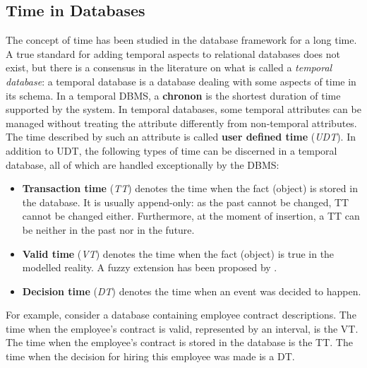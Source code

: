 %
%
\subsection{\label{subsec:time-in-databases}Time in Databases}
The concept of time has been studied in the database framework for a long time. A true standard for adding temporal aspects to relational databases does not exist, but there is a consensus in the literature \cite{Dyreson1994} on what is called a \emph{temporal database}: a temporal database is a database dealing with some aspects of time in its schema.
In a temporal DBMS, a \textbf{chronon} is the shortest duration of time supported by the system. In temporal databases, some temporal attributes can be managed without treating the attribute differently from non-temporal attributes. The time described by such an attribute is called \textbf{user defined time} (\emph{UDT}). In addition to UDT, the following types of time can be discerned in a temporal database, all of which are handled exceptionally by the DBMS:

\begin{itemize}
	\item
	\textbf{Transaction time} (\emph{TT}) \cite{Rowe1987,Jensen1991} denotes the time when the fact (object) is stored in the database. It is usually append-only: as the past cannot be changed, TT cannot be changed either. Furthermore, at the moment of insertion, a TT can be neither in the past nor in the future.
	\item
	\textbf{Valid time} (\emph{VT}) \cite{Jensen1994,Sarda1990,McKenzie1981} denotes the time when the fact (object) is true in the modelled reality. A fuzzy extension has been proposed by \cite{Garrido2009}. 
	\item
	\textbf{Decision time} (\emph{DT}) \cite{Nascimento1995,Chakravarthy1994,Etzion1992,Ozsoyoglu1995} denotes the time when an event was decided to happen. 
	\end{itemize}
	 
	For example, consider a database containing employee contract descriptions. The time when the employee's contract is valid, represented by an interval, is the VT. The time when the employee's contract is stored in the database is the TT. The time when the decision for hiring this employee was made is a DT.

